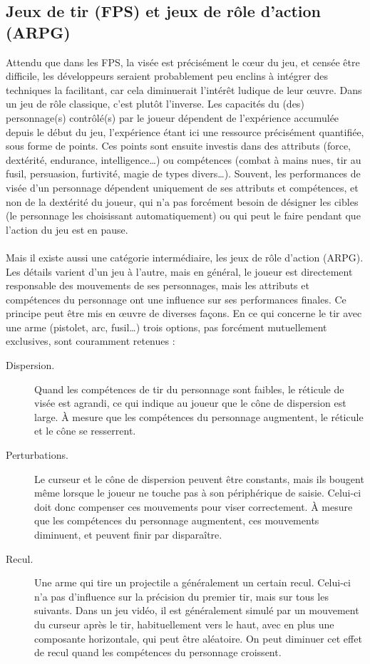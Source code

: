 	\subsection{Jeux de tir (FPS) et jeux de rôle d'action (ARPG)}
	Attendu que dans les FPS, la visée est précisément le cœur du jeu, et censée être difficile, les développeurs seraient probablement peu enclins à intégrer des techniques la facilitant, car cela diminuerait l'intérêt ludique de leur œuvre. Dans un jeu de rôle classique, c'est plutôt l'inverse. Les capacités du (des) personnage(s) contrôlé(s) par le joueur dépendent de l'expérience accumulée depuis le début du jeu, l'expérience étant ici une ressource précisément quantifiée, sous forme de points. Ces points sont ensuite investis dans des attributs (force, dextérité, endurance, intelligence\ldots{}) ou compétences (combat à mains nues, tir au fusil, persuasion, furtivité, magie de types divers\ldots{}). Souvent, les performances de visée d'un personnage dépendent uniquement de ses attributs et compétences, et non de la dextérité du joueur, qui n'a pas forcément besoin de désigner les cibles (le personnage les choisissant automatiquement) ou qui peut le faire pendant que l'action du jeu est en pause.
	
	\paragraph{}
	Mais il existe aussi une catégorie intermédiaire, les jeux de rôle d'action (ARPG). Les détails varient d'un jeu à l'autre, mais en général, le joueur est directement responsable des mouvements de ses personnages, mais les attributs et compétences du personnage ont une influence sur ses performances finales. Ce principe peut être mis en œuvre de diverses façons. En ce qui concerne le tir avec une arme (pistolet, arc, fusil\ldots{}) trois options, pas forcément mutuellement exclusives, sont couramment retenues :
	\begin{description}
		\item[Dispersion.] Quand les compétences de tir du personnage sont faibles, le réticule de visée est agrandi, ce qui indique au joueur que le cône de dispersion est large. À mesure que les compétences du personnage augmentent, le réticule et le cône se resserrent.
		\item[Perturbations.] Le curseur et le cône de dispersion peuvent être constants, mais ils bougent même lorsque le joueur ne touche pas à son périphérique de saisie. Celui-ci doit donc compenser ces mouvements pour viser correctement. À mesure que les compétences du personnage augmentent, ces mouvements diminuent, et peuvent finir par disparaître.
		\item[Recul.] Une arme qui tire un projectile a généralement un certain recul. Celui-ci n'a pas d'influence sur la précision du premier tir, mais sur tous les suivants. Dans un jeu vidéo, il est généralement simulé par un mouvement du curseur après le tir, habituellement vers le haut, avec en plus une composante horizontale, qui peut être aléatoire. On peut diminuer cet effet de recul quand les compétences du personnage croissent.
	\end{description}

